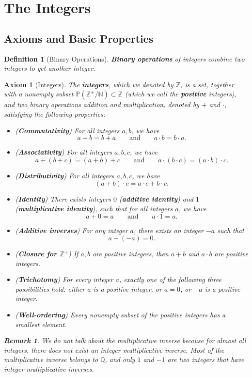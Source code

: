 \documentclass[12pt,a4paper]{article}
\newtheorem{ax}{Axiom}[section]
\newtheorem{df}{Definition}[subsection]
\newtheorem*{rmk}{\indent Remark}
\def\Z{{\mathbb{Z}}}
\def\Q{{\mathbb{Q}}}
\def\N{{\mathbb{N}}}
\def\Zp{{\Z^{+}}}
\begin{document}
\newpage
\section{The Integers}
\subsection{Axioms and Basic Properties}
\begin{df}[Binary Operations]
	\textbf{Binary operations} of integers combine two integers to get another integer.	
\end{df}
\begin{ax}[Integers]
	The \textbf{integers}, which we denoted by $\Z$, is a set, together with a nonempty subset $\mathbb{P}(\Zp/\N)\subset \Z$ (which we call the \textbf{positive} integers), and two binary operations addition and multiplication, denoted by $+$ and $\cdot$, satisfying the following properties: 
	\begin{itemize}
		\item (\textbf{Commutativity}) For all integers $a,b$, we have \[a+b=b+a\qquad\text{and}\qquad a\cdot b=b\cdot a.\]
		\item (\textbf{Associativity}) For all integers $a,b,c$, we have \[a+(b+c)=(a+b)+c\qquad\text{and}\qquad a\cdot(b\cdot c)=(a\cdot b)\cdot c.\]
		\item (\textbf{Distributivity}) For all integers $a,b,c$, we have \[(a+b)\cdot c=a\cdot c+b\cdot c.\]
		\item (\textbf{Identity}) There exists integers $0$ (\textbf{additive identity}) and $1$ (\textbf{multiplicative identity}), such that for all integers $a$, we have \[a+0=a\qquad\text{and}\qquad a\cdot1=a.\]
		\item (\textbf{Additive inverses}) For any integer $a$, there exists an integer $-a$ such that \[a+(-a)=0.\]
		\item (\textbf{Closure for $\Zp$}) If $a,b$ are positive integers, then $a+b$ and $a\cdot b$ are positive integers.
		\item (\textbf{Trichotomy}) For every integer $a$, exactly one of the following three possibilities hold: either $a$ is a positive integer, or $a=0$, or $-a$ is a positive integer. 
		\item (\textbf{Well-ordering}) Every nonempty subset of the positive integers has a smallest element. 
	\end{itemize}
	\begin{rmk} We do not talk about the multiplicative inverse because for almost all integers, there does not exist an integer multiplicative inverse. Most of the multiplicative inverse belongs to $\Q$, and only $1$ and $-1$ are two integers that have integer multiplicative inverses. \end{rmk}
\end{ax}
\end{document}
